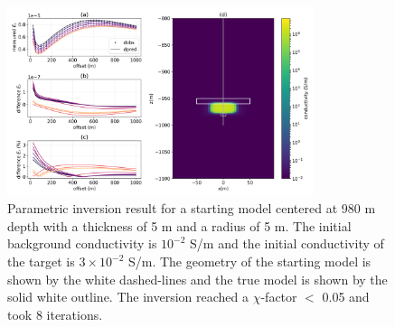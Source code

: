 \begin{figure}
    \begin{center}
    \includegraphics[width=0.8\textwidth]{figures/inversion/parametric_voxel1.png}
    \end{center}
\caption{
    Parametric inversion result for a starting model
    centered at 980 m depth with a thickness of 5 m and a radius of 5 m. The initial background
    conductivity is $10^{-2}$ S/m and the initial conductivity of the target is $3\times10^{-2}$ S/m.
    The geometry of the starting model is shown by the white dashed-lines and the
    true model is shown by the solid white outline. The inversion reached a $\chi$-factor $<$ 0.05
    and took 8 iterations.
}
\label{fig:parametric_voxel1}
\end{figure}
